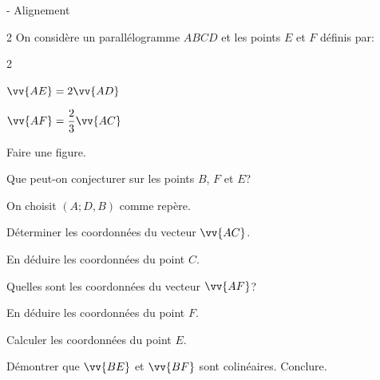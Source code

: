 \documentclass[11pt,a4paper]{article}  %
\begin{document}

\begin{exercice}{ - Alignement}
	\begin{multicols}{2}
	On considère un parallélogramme $ABCD$ et les points $E$ et $F$ définis par:
	\begin{multicols}{2}
		\begin{itemMet}
			\item $\vv {AE} = 2 \vv {AD}$
			\item $\vv {AF} = \dfrac{2}{3} \vv {AC}$
		\end{itemMet}
	\end{multicols}
	\begin{enumMet}
		\item Faire une figure.
		\item Que peut-on conjecturer sur les points $B$, $F$ et $E$?
	\end{enumMet}
	On choisit $\left(A;D,B\right)$ comme repère.
	\begin{enumMet}[resume]
		\item Déterminer les coordonnées du vecteur $\vv {AC}$. 
		\item En déduire les coordonnées du point $C$.
		\item Quelles sont les coordonnées du vecteur $\vv{AF}$?
		\item En déduire les coordonnées du point $F$.
		\item Calculer les coordonnées du point $E$.
		\item Démontrer que $\vv{BE}$ et $\vv{BF}$ sont colinéaires. Conclure.
	\end{enumMet}
	\end{multicols}
\end{exercice}
\end{document}
